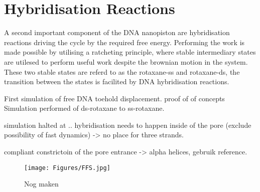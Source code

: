 \section{Hybridisation Reactions}

A second important component of the DNA nanopiston are hybridisation reactions driving
the cycle by the required free energy. Performing the work is made possible by utilising
a ratcheting principle, where stable intermediary states are utilesed to perform useful
work despite the brownian motion in the system. These two stable states are referd to as
the rotaxane-ss and rotaxane-ds, the transition between the states is facilited by DNA
hybridisation reactions.


First simulation of free DNA toehold displacement. proof of of concepts
Simulation performed of ds-rotaxane to ss-rotaxane.

simulation halted at ..
hybridisation needs to happen inside of the pore (exclude possibility of fast dynamics)
-> no place for three strands.

compliant constrictoin of the pore entrance -> alpha helices, gebruik reference.

\begin{figure}[ht!]
  \centering
  \texttt{[image: Figures/FFS.jpg]}
  \caption{Nog maken}
\end{figure}


